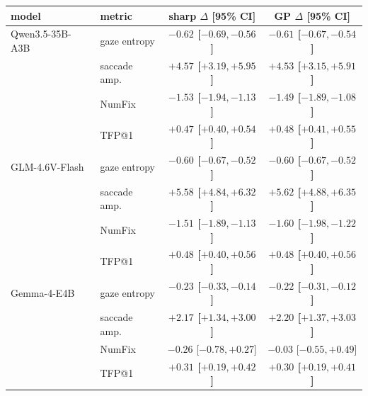 \begin{tabular}{llcc}
\toprule
model & metric & sharp $\Delta$ [95\% CI] & GP $\Delta$ [95\% CI] \\
\midrule
Qwen3.5-35B-A3B & gaze entropy & \textbf{$-0.62$ [$-0.69,-0.56$]} & \textbf{$-0.61$ [$-0.67,-0.54$]} \\
 & saccade amp. & \textbf{$+4.57$ [$+3.19,+5.95$]} & \textbf{$+4.53$ [$+3.15,+5.91$]} \\
 & NumFix & \textbf{$-1.53$ [$-1.94,-1.13$]} & \textbf{$-1.49$ [$-1.89,-1.08$]} \\
 & TFP@1 & \textbf{$+0.47$ [$+0.40,+0.54$]} & \textbf{$+0.48$ [$+0.41,+0.55$]} \\
\midrule
GLM-4.6V-Flash & gaze entropy & \textbf{$-0.60$ [$-0.67,-0.52$]} & \textbf{$-0.60$ [$-0.67,-0.52$]} \\
 & saccade amp. & \textbf{$+5.58$ [$+4.84,+6.32$]} & \textbf{$+5.62$ [$+4.88,+6.35$]} \\
 & NumFix & \textbf{$-1.51$ [$-1.89,-1.13$]} & \textbf{$-1.60$ [$-1.98,-1.22$]} \\
 & TFP@1 & \textbf{$+0.48$ [$+0.40,+0.56$]} & \textbf{$+0.48$ [$+0.40,+0.56$]} \\
\midrule
Gemma-4-E4B & gaze entropy & \textbf{$-0.23$ [$-0.33,-0.14$]} & \textbf{$-0.22$ [$-0.31,-0.12$]} \\
 & saccade amp. & \textbf{$+2.17$ [$+1.34,+3.00$]} & \textbf{$+2.20$ [$+1.37,+3.03$]} \\
 & NumFix & $-0.26$ [$-0.78,+0.27$] & $-0.03$ [$-0.55,+0.49$] \\
 & TFP@1 & \textbf{$+0.31$ [$+0.19,+0.42$]} & \textbf{$+0.30$ [$+0.19,+0.41$]} \\
\bottomrule
\end{tabular}
